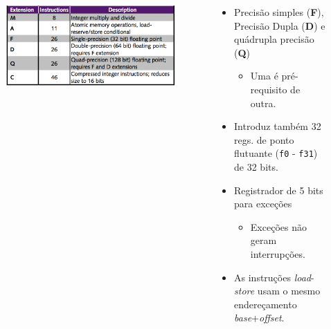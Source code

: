 \documentclass[red, aspectratio=169, xcolor=dvipsnames]{beamer}
\let\olditem=\item%
\renewcommand{\item}{\olditem \justifying}
\begin{document}
\begin{frame}%
	\begin{columns}
		\begin{column}{0.62\textwidth}
			\begin{figure}
				\centering
				\label{fig:bi2}
				\includegraphics[width=1\textwidth]{img/base-instruction-b.png}
			\end{figure}
		\end{column}
		\begin{column}{0.4\textwidth}

			\begin{itemize}
				\setlength{\itemsep}{1.5em}
				\item Precisão simples (\textbf{F}), Precisão Dupla (\textbf{D}) e quádrupla precisão (\textbf{Q})
				\begin{itemize}
					\item Uma é pré-requisito de outra.
				\end{itemize}
			
				\item Introduz também 32 regs. de ponto flutuante (\texttt{f0} - \texttt{f31}) de 32 bits.
				\item Registrador de 5 bits para exceções
				\begin{itemize}
					\item Exceções não geram interrupções. 
				\end{itemize}
				\item As instruções \textit{load}-\textit{store} usam o mesmo endereçamento \textit{base}+\textit{offset}.
			\end{itemize}
		\end{column}
	\end{columns}
\end{frame}
\end{document}
